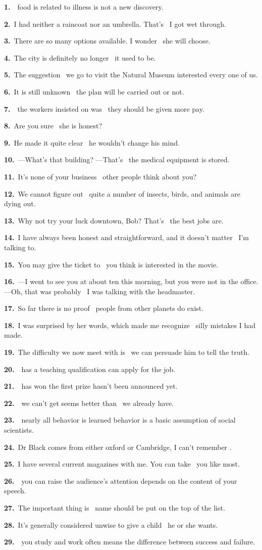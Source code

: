 \documentclass[10pt,a4paper]{article}
\newcommand{\STAR}{\textcolor{wrongred}{\starfont ★}}
\newcommand{\STARSLOT}[1]{\makebox[1.35em][l]{#1}}
\newcommand{\blank}{\underline{\hspace{1.8cm}}}
\newcommand{\ff}[3]{\noindent\STARSLOT{#2}\textbf{#1.}~#3\par\vspace{0.45em}}
\begin{document}
\vspace{0.5em}
\ff{1}{}{\blank\ food is related to illness is not a new discovery.}
\ff{2}{}{I had neither a raincoat nor an umbrella. That's \blank\ I got wet through.}
\ff{3}{\STAR}{There are so many options available. I wonder \blank\ she will choose.}
\ff{4}{}{The city is definitely no longer \blank\ it used to be.}
\ff{5}{}{The suggestion \blank\ we go to visit the Natural Museum interested every one of us.}
\ff{6}{}{It is still unknown \blank\ the plan will be carried out or not.}
\ff{7}{}{\blank\ the workers insisted on was \blank\ they should be given more pay.}
\ff{8}{}{Are you sure \blank\ she is honest?}
\ff{9}{}{He made it quite clear \blank\ he wouldn't change his mind.}
\ff{10}{}{---What's that building? ---That's \blank\ the medical equipment is stored.}
\ff{11}{\STAR}{It's none of your business \blank\ other people think about you?}
\ff{12}{\STAR}{We cannot figure out \blank\ quite a number of insects, birds, and animals are dying out.}
\ff{13}{\STAR}{Why not try your luck downtown, Bob? That's \blank\ the best jobs are.}
\ff{14}{\STAR}{I have always been honest and straightforward, and it doesn't matter \blank\ I'm talking to.}
\ff{15}{\STAR}{You may give the ticket to \blank\ you think is interested in the movie.}
\ff{16}{\STAR}{---I went to see you at about ten this morning, but you were not in the office. ---Oh, that was probably \blank\ I was talking with the headmaster.}
\ff{17}{}{So far there is no proof \blank\ people from other planets do exist.}
\ff{18}{}{I was surprised by her words, which made me recognize \blank\ silly mistakes I had made.}
\ff{19}{\STAR}{The difficulty we now meet with is \blank\ we can persuade him to tell the truth.}
\ff{20}{\STAR}{\blank\ has a teaching qualification can apply for the job.}
\newpage
\ff{21}{}{\blank\ has won the first prize hasn't been announced yet.}
\ff{22}{\STAR}{\blank\ we can't get seems better than \blank\ we already have.}
\ff{23}{}{\blank\ nearly all behavior is learned behavior is a basic assumption of social scientists.}
\ff{24}{\STAR}{Dr Black comes from either oxford or Cambridge, I can't remember \blank.}
\ff{25}{\STAR}{I have several current magazines with me. You can take \blank\ you like most.}
\ff{26}{\STAR}{\blank\ you can raise the audience's attention depends on the content of your speech.}
\ff{27}{\STAR}{The important thing is \blank\ name should be put on the top of the list.}
\ff{28}{\STAR}{It's generally considered unwise to give a child \blank\ he or she wants.}
\ff{29}{}{\blank\ you study and work often means the difference between success and failure.}
\end{document}
